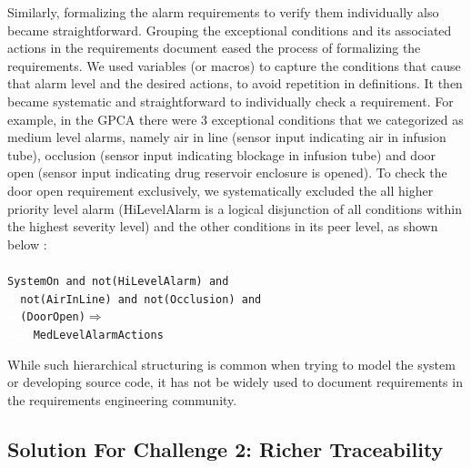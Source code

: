 Similarly, formalizing the alarm requirements to verify them individually also became straightforward. Grouping the exceptional conditions and its associated actions in the requirements document eased the process of formalizing the requirements. We used variables (or macros) to capture the conditions that cause that alarm level and the desired actions, to avoid repetition in definitions. It then became systematic and straightforward to individually check a requirement. For example, in the GPCA there were 3 exceptional conditions that we categorized as medium level alarms, namely air in line (sensor input indicating air in infusion tube), occlusion (sensor input indicating blockage in infusion tube) and door open (sensor input indicating drug reservoir enclosure is opened). To check the door open requirement exclusively, we systematically excluded the all higher priority level alarm (HiLevelAlarm is a logical disjunction of all conditions within the highest severity level) and the other conditions in its peer level, as shown below :
\\\\
\footnotesize{\texttt{SystemOn and not(HiLevelAlarm) and \\
\textcolor{white}{----}not(AirInLine) and not(Occlusion) and \\ \textcolor{white}{------}(DoorOpen)$\Rightarrow$\\
\textcolor{white}{--------} MedLevelAlarmActions}}
\\\normalsize{}

While such hierarchical structuring is common when trying to model the system or developing source code, it has not be widely used to document requirements in the requirements engineering community. %

\subsection {Solution For Challenge 2: Richer Traceability}

